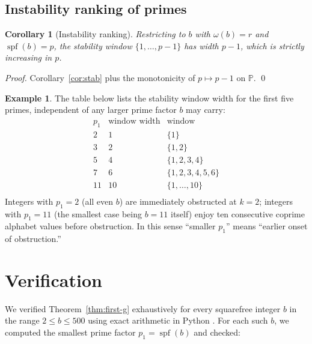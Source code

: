 \documentclass[11pt,reqno]{amsart}
\newtheorem{corollary}[theorem]{Corollary}
\theoremstyle{definition}
\newtheorem{example}[theorem]{Example}
\newcommand{\Prm}{\mathbb{P}}
\DeclareMathOperator{\spf}{spf}
\begin{document}
\subsection{Instability ranking of primes}
\label{ssec:instability}

\begin{corollary}[Instability ranking]
\label{cor:instability}
Restricting to $b$ with $\omega(b) = r$ and $\spf(b) = p$, the stability
window $\{1, \ldots, p-1\}$ has width $p - 1$, which is strictly increasing
in $p$.
\end{corollary}

\begin{proof}
Corollary~\ref{cor:stab} plus the monotonicity of $p \mapsto p - 1$ on
$\Prm$.
\qed
\end{proof}

\begin{example}
The table below lists the stability window width for the first five primes,
independent of any larger prime factor $b$ may carry:
\[
\begin{array}{c|c|l}
  p_1 & \text{window width} & \text{window} \\
  \hline
  2 & 1 & \{1\} \\
  3 & 2 & \{1,2\} \\
  5 & 4 & \{1,2,3,4\} \\
  7 & 6 & \{1,2,3,4,5,6\} \\
  11 & 10 & \{1,\ldots,10\} \\
\end{array}
\]
Integers with $p_1 = 2$ (all even $b$) are immediately obstructed at $k = 2$;
integers with $p_1 = 11$ (the smallest case being $b = 11$ itself) enjoy
ten consecutive coprime alphabet values before obstruction. In this sense
``smaller $p_1$'' means ``earlier onset of obstruction.''
\end{example}

\section{Verification}
\label{sec:verification}

We verified Theorem~\ref{thm:first-g} exhaustively for every squarefree
integer $b$ in the range $2 \le b \le 500$ using exact arithmetic in Python
\cite{proof}. For each such $b$, we computed the smallest prime factor
$p_1 = \spf(b)$ and checked:
\end{document}
